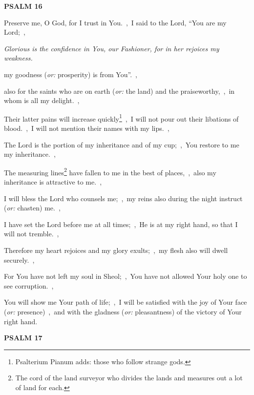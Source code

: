 \documentclass[12pt,twoside,a5paper]{article}
\newcommand{\psalm}[1]{\textbf{PSALM {#1}}}
\newcommand{\qanona}[1]{{\liturgicalhint{Qanona.} \emph{#1}}}
\newcommand{\translationoption}[1]{\emph{or:} #1}
\begin{document}
\psalm{16}

\begin{normalparskip}
  Preserve me, O God, for I trust in You.~\sep\ I said to the Lord, ``You are my Lord;~\sep

  \qanona{Glorious is the confidence in You, our Fashioner, for in her rejoices my weakness.}

  my goodness (\translationoption{prosperity}) is from You''.~\sep

  also for the saints who are on earth (\translationoption{the land}) and the praiseworthy,~\sep\ in whom is all my delight.~\sep

  Their latter pains will increase quickly\footnote{Psalterium Pianum adds: those who follow strange gods.}~\sep\ I will not pour out their libations of blood.~\sep\ I will not mention their names with my lips.~\sep

  The Lord is the portion of my inheritance and of my cup;~\sep\ You restore to me my inheritance.~\sep

  The measuring lines\footnote{The cord of the land surveyor who divides the lands and measures out a lot of land for each.} have fallen to me in the best of places,~\sep\ also my inheritance is attractive to me.~\sep

  I will bless the Lord who counsels me;~\sep\ my reins also during the night instruct (\translationoption{chasten}) me.~\sep

  I have set the Lord before me at all times;~\sep\ He is at my right hand, so that I will not tremble.~\sep

  Therefore my heart rejoices and my glory exults;~\sep\ my flesh also will dwell securely.~\sep

  For You have not left my soul in Sheol;~\sep\ You have not allowed Your holy one to see corruption.~\sep

  You will show me Your path of life;~\sep\ I will be satisfied with the joy of Your face (\translationoption{presence})~\sep\ and with the gladness (\translationoption{pleasantness}) of the victory of Your right hand.
\end{normalparskip}

\psalm{17}
\end{document}
